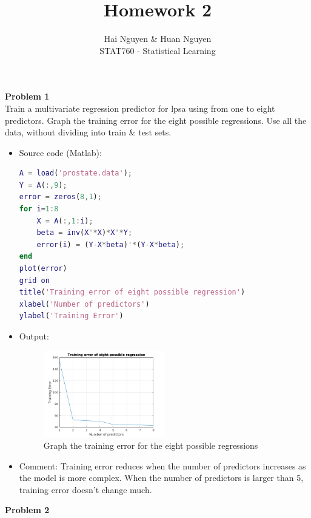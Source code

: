 \documentclass[12pt]{article}
\begin{document}
 
 
 
\title{Homework 2}%
\author{Hai Nguyen \& Huan Nguyen\\ %
STAT760 - Statistical Learning} %
 
\maketitle
 
\textbf{Problem 1}
\\Train a multivariate regression predictor for lpsa using from one to eight predictors. Graph the training error for the eight possible regressions. Use all the data, without dividing into train \& test sets.

\begin{itemize}
\item Source code (Matlab):
\begin{lstlisting}[language=Matlab]
A = load('prostate.data');
Y = A(:,9);
error = zeros(8,1);
for i=1:8
    X = A(:,1:i);
    beta = inv(X'*X)*X'*Y;
    error(i) = (Y-X*beta)'*(Y-X*beta);
end
plot(error)
grid on
title('Training error of eight possible regression')
xlabel('Number of predictors')
ylabel('Training Error')
\end{lstlisting}
\item Output:

\begin{figure}[h!]
\begin{center}
  \caption{Graph the training error for the eight possible regressions}
  \includegraphics[width=0.5\textwidth]{images/hw2.png}
 \end{center}
\end{figure}

\item Comment:
Training error reduces when the number of predictors increases as the model is more complex. When the number of predictors is larger than 5, training error doesn't change much.   

\end{itemize}
\textbf{Problem 2}
\end{document}
